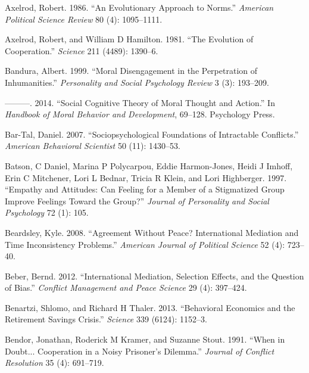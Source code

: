 \documentclass[11pt]{article}
\begin{document}
\leavevmode\hypertarget{ref-axelrod1986evolutionary}{}%
Axelrod, Robert. 1986. ``An Evolutionary Approach to Norms.''
\emph{American Political Science Review} 80 (4): 1095--1111.

\leavevmode\hypertarget{ref-axelrod1981evolution}{}%
Axelrod, Robert, and William D Hamilton. 1981. ``The Evolution of
Cooperation.'' \emph{Science} 211 (4489): 1390--6.

\leavevmode\hypertarget{ref-bandura1999moral}{}%
Bandura, Albert. 1999. ``Moral Disengagement in the Perpetration of
Inhumanities.'' \emph{Personality and Social Psychology Review} 3 (3):
193--209.

\leavevmode\hypertarget{ref-bandura2014social}{}%
---------. 2014. ``Social Cognitive Theory of Moral Thought and
Action.'' In \emph{Handbook of Moral Behavior and Development}, 69--128.
Psychology Press.

\leavevmode\hypertarget{ref-bar2007sociopsychological}{}%
Bar-Tal, Daniel. 2007. ``Sociopsychological Foundations of Intractable
Conflicts.'' \emph{American Behavioral Scientist} 50 (11): 1430--53.

\leavevmode\hypertarget{ref-batson1997empathy}{}%
Batson, C Daniel, Marina P Polycarpou, Eddie Harmon-Jones, Heidi J
Imhoff, Erin C Mitchener, Lori L Bednar, Tricia R Klein, and Lori
Highberger. 1997. ``Empathy and Attitudes: Can Feeling for a Member of a
Stigmatized Group Improve Feelings Toward the Group?'' \emph{Journal of
Personality and Social Psychology} 72 (1): 105.

\leavevmode\hypertarget{ref-beardsley2008agreement}{}%
Beardsley, Kyle. 2008. ``Agreement Without Peace? International
Mediation and Time Inconsistency Problems.'' \emph{American Journal of
Political Science} 52 (4): 723--40.

\leavevmode\hypertarget{ref-beber2012international}{}%
Beber, Bernd. 2012. ``International Mediation, Selection Effects, and
the Question of Bias.'' \emph{Conflict Management and Peace Science} 29
(4): 397--424.

\leavevmode\hypertarget{ref-benartzi2013behavioral}{}%
Benartzi, Shlomo, and Richard H Thaler. 2013. ``Behavioral Economics and
the Retirement Savings Crisis.'' \emph{Science} 339 (6124): 1152--3.

\leavevmode\hypertarget{ref-bendor1991doubt}{}%
Bendor, Jonathan, Roderick M Kramer, and Suzanne Stout. 1991. ``When in
Doubt... Cooperation in a Noisy Prisoner's Dilemma.'' \emph{Journal of
Conflict Resolution} 35 (4): 691--719.
\end{document}

